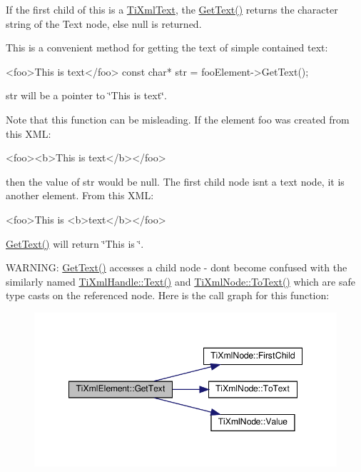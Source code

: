 If the first child of \textquotesingle{}this\textquotesingle{} is a \hyperlink{classTiXmlText}{Ti\+Xml\+Text}, the \hyperlink{classTiXmlElement_af0f814ecbd43d50d4cdbdf4354d3da39}{Get\+Text()} returns the character string of the Text node, else null is returned.

This is a convenient method for getting the text of simple contained text\+: \begin{DoxyVerb}<foo>This is text</foo>
const char* str = fooElement->GetText();
\end{DoxyVerb}


\textquotesingle{}str\textquotesingle{} will be a pointer to \char`\"{}\+This is text\char`\"{}.

Note that this function can be misleading. If the element foo was created from this X\+ML\+: \begin{DoxyVerb}<foo><b>This is text</b></foo> 
\end{DoxyVerb}


then the value of str would be null. The first child node isn\textquotesingle{}t a text node, it is another element. From this X\+ML\+: \begin{DoxyVerb}<foo>This is <b>text</b></foo> 
\end{DoxyVerb}
 \hyperlink{classTiXmlElement_af0f814ecbd43d50d4cdbdf4354d3da39}{Get\+Text()} will return \char`\"{}\+This is \char`\"{}.

W\+A\+R\+N\+I\+NG\+: \hyperlink{classTiXmlElement_af0f814ecbd43d50d4cdbdf4354d3da39}{Get\+Text()} accesses a child node -\/ don\textquotesingle{}t become confused with the similarly named \hyperlink{classTiXmlHandle_ad3b502c72059421e4dfcc7bda3c392fe}{Ti\+Xml\+Handle\+::\+Text()} and \hyperlink{classTiXmlNode_a3ddfbcac78fbea041fad57e5c6d60a03}{Ti\+Xml\+Node\+::\+To\+Text()} which are safe type casts on the referenced node. Here is the call graph for this function\+:
\nopagebreak
\begin{figure}[H]
\begin{center}
\leavevmode
\includegraphics[width=348pt]{classTiXmlElement_af0f814ecbd43d50d4cdbdf4354d3da39_cgraph}
\end{center}
\end{figure}
\mbox{\label{classTiXmlElement_aa31a15cddfb8601a31236fe7d2569fb4}} 
